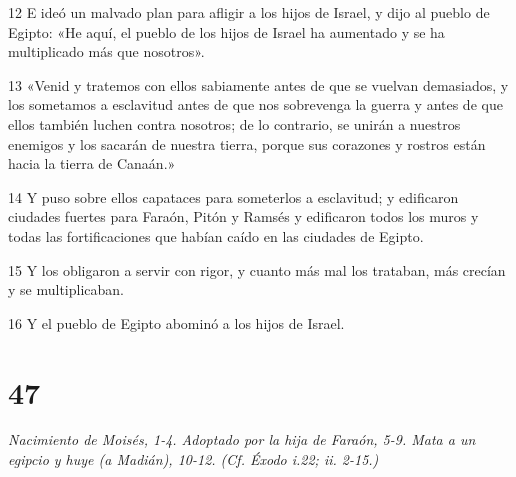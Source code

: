 \par 12 E ideó un malvado plan para afligir a los hijos de Israel, y dijo al pueblo de Egipto: «He aquí, el pueblo de los hijos de Israel ha aumentado y se ha multiplicado más que nosotros».
\par 13 «Venid y tratemos con ellos sabiamente antes de que se vuelvan demasiados, y los sometamos a esclavitud antes de que nos sobrevenga la guerra y antes de que ellos también luchen contra nosotros; de lo contrario, se unirán a nuestros enemigos y los sacarán de nuestra tierra, porque sus corazones y rostros están hacia la tierra de Canaán.»
\par 14 Y puso sobre ellos capataces para someterlos a esclavitud; y edificaron ciudades fuertes para Faraón, Pitón y Ramsés y edificaron todos los muros y todas las fortificaciones que habían caído en las ciudades de Egipto.
\par 15 Y los obligaron a servir con rigor, y cuanto más mal los trataban, más crecían y se multiplicaban.
\par 16 Y el pueblo de Egipto abominó a los hijos de Israel.

\chapter{47}

\par \textit{Nacimiento de Moisés, 1-4. Adoptado por la hija de Faraón, 5-9. Mata a un egipcio y huye (a Madián), 10-12. (Cf. Éxodo i.22; ii. 2-15.)}

